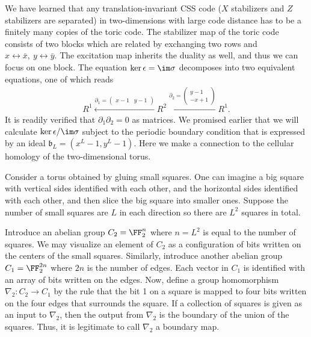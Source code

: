 We have learned that any translation-invariant CSS code
($X$ stabilizers and $Z$ stabilizers are separated)
in two-dimensions with large code distance has to be a finitely many copies of
the toric code.
The stabilizer map of the toric code consists of two blocks
which are related by exchanging two rows and $x \leftrightarrow \bar x,~
y \leftrightarrow \bar y$.
The excitation map inherits the duality as well,
and thus we can focus on one block.
The equation $\ker \epsilon = \im \sigma$ decomposes
into two equivalent equations, one of which reads
\begin{align}
R^1 \xleftarrow{\partial_1 = \begin{pmatrix} x-1 & y-1\end{pmatrix}}
R^2 \xleftarrow{\partial_2 = \begin{pmatrix} y-1\\ -x+1\end{pmatrix}}
R^1.
\end{align}
It is readily verified that $\partial_1 \partial_2 = 0$ as matrices.
We promised earlier that we will calculate $\ker \epsilon / \im \sigma$
subject to the periodic boundary condition that is 
expressed by an ideal $\mathfrak b_L = (x^L-1,y^L-1)$.
Here we make a connection to the cellular homology of the two-dimensional torus.

Consider a torus obtained by gluing small squares.
One can imagine a big square with vertical sides identified with each other,
and the horizontal sides identified with each other,
and then slice the big square into smaller ones.
Suppose the number of small squares are $L$ in each direction
so there are $L^2$ squares in total.

Introduce an abelian group $C_2 = \FF_2^n$ 
where $n = L^2$ is equal to the number of squares.
We may visualize an element of $C_2$ as a configuration of bits written 
on the centers of the small squares.
Similarly, introduce another abelian group $C_1 = \FF_2^{2n}$
where $2n$ is the number of edges.
Each vector in $C_1$ is identified with an array of bits
written on the edges.
Now, define a group homomorphism $\nabla_2 : C_2 \to C_1$
by the rule that the bit 1 on a square is mapped to
four bits written on the four edges that surrounds the square.
If a collection of squares is given as an input to $\nabla_2$,
then the output from $\nabla_2$
is the boundary of the union of the squares.
Thus, it is legitimate to call $\nabla_2$ a boundary map.

